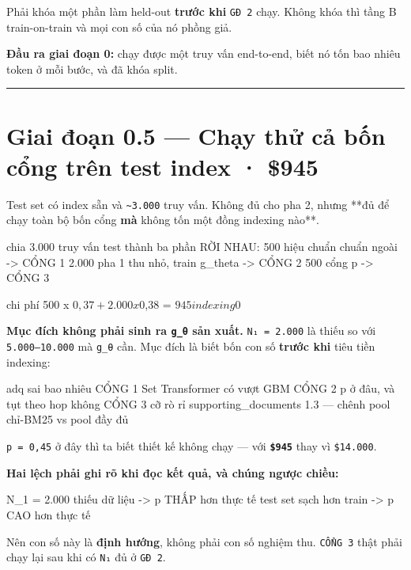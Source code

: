 \documentclass[11pt,a4paper]{article}
\begin{document}
Phải khóa một phần làm held-out \textbf{trước khi} \texttt{GĐ 2} chạy. Không khóa thì tầng B
train-on-train và mọi con số của nó phồng giả.

\textbf{Đầu ra giai đoạn 0:} chạy được một truy vấn end-to-end, biết nó tốn bao nhiêu token ở mỗi
bước, và đã khóa split.

\vspace{0.3em}\hrule\vspace{0.6em}

\section{Giai đoạn 0.5 — Chạy thử cả bốn cổng trên test index · \textbf{\$945}}

Test set có index sẵn và \texttt{\textasciitilde{}3.000} truy vấn. Không đủ cho pha 2, nhưng **đủ để chạy toàn bộ bốn
cổng\textbf{ mà }không tốn một đồng indexing nào**.

\begin{dia}
chia 3.000 truy vấn test thành ba phần RỜI NHAU:
    500    hiệu chuẩn chuẩn ngoài        ->  CỔNG 1
  2.000    pha 1 thu nhỏ, train g_theta      ->  CỔNG 2
    500    cổng p                        ->  CỔNG 3

chi phí   500 x $0,37  +  2.000 x $0,38   =   $945
indexing  $0
\end{dia}

\textbf{Mục đích không phải sinh ra \texttt{g\_θ} sản xuất.} \texttt{N₁ = 2.000} là thiếu so với \texttt{5.000–10.000}
mà \texttt{g\_θ} cần. Mục đích là biết bốn con số \textbf{trước khi} tiêu tiền indexing:

\begin{dia}
adq sai bao nhiêu                 CỔNG 1
Set Transformer có vượt GBM       CỔNG 2
p ở đâu, và tụt theo hop không    CỔNG 3
cỡ rò rỉ supporting_documents     1.3 — chênh pool chỉ-BM25 vs pool đầy đủ
\end{dia}

\texttt{p = 0,45} ở đây thì ta biết thiết kế không chạy — với \textbf{\texttt{\$945}} thay vì \texttt{\$14.000}.

\textbf{Hai lệch phải ghi rõ khi đọc kết quả, và chúng ngược chiều:}

\begin{dia}
N_1 = 2.000 thiếu dữ liệu   ->  p THẤP hơn thực tế
test set sạch hơn train    ->  p CAO hơn thực tế
\end{dia}

Nên con số này là \textbf{định hướng}, không phải con số nghiệm thu. \texttt{CỔNG 3} thật phải chạy lại
sau khi có \texttt{N₁} đủ ở \texttt{GĐ 2}.
\end{document}
